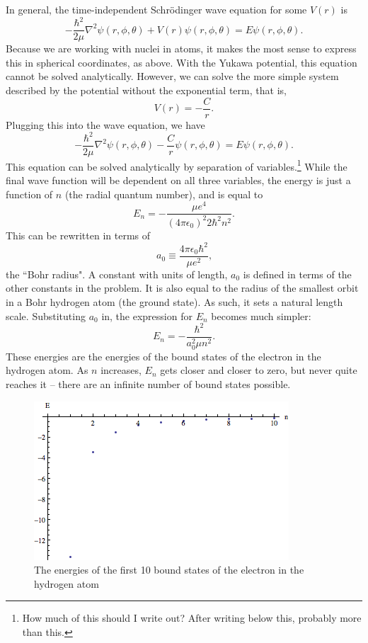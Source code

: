 \documentclass[12pt,twoside]{reedthesis}
\newcommand{\eqn}[1]{\begin{equation}#1\end{equation}}
\begin{document}
In general, the time-independent Schr\"odinger wave equation for some $V(r)$ is
\eqn{
-\frac{\hbar^2}{2\mu}\nabla^2\psi(r,\phi,\theta) + V(r)\psi (r,\phi,\theta) = E \psi(r,\phi,\theta)\mbox{.}
\label{eq:TIDSWE-general}
}
Because we are working with nuclei in atoms, it makes the most sense to express this in spherical coordinates, as above. With the Yukawa potential, this equation cannot be solved analytically. However, we can solve the more simple system described by the potential without the exponential term, that is,
\eqn{
 V(r) = -\frac{C}{r}\mbox{.}
 }
 Plugging this into the wave equation, we have
 \eqn{
 -\frac{\hbar^2}{2\mu}\nabla^2\psi(r,\phi,\theta) -\frac{C}{r}\psi (r,\phi,\theta) = E \psi(r,\phi,\theta)\mbox{.}
 }
This equation can be solved analytically by separation of variables.\footnote{How much of this should I write out? After writing below this, probably more than this.} While the final wave function will be dependent on all three variables, the energy is just a function of $n$ (the radial quantum number), and is equal to
\eqn{
E_n = -\frac{\mu e^4}{(4 \pi \epsilon_0)^2 2 \hbar ^2 n^2}\mbox{.}
\label{eq:hydrogen-E}
}
This can be rewritten in terms of 
\eqn{
a_0 \equiv \frac{4 \pi \epsilon_0 \hbar ^2}{\mu e^2}\mbox{,}
}
the ``Bohr radius". A constant with units of length, $a_0$ is defined in terms of the other constants in the problem. It is also equal to the radius of the smallest orbit in a Bohr hydrogen atom (the ground state). As such, it sets a natural length scale. Substituting $a_0$ in, the expression for $E_n$ becomes much simpler:
\eqn{
E_n = -\frac{\hbar^2}{a_0^2 \mu n^2}\mbox{.}
\label{eq:hydrogen-Ebohr}
}
These energies are the energies of the bound states of the electron in the hydrogen atom. As $n$ increases, $E_n$ gets closer and closer to zero, but never quite reaches it -- there are an infinite number of bound states possible.
\begin{figure}
\includegraphics[scale=0.75]{hydrogenspectrum.png}
\caption{The energies of the first 10 bound states of the electron in the hydrogen atom}
\label{fig:hspec}
\end{figure}
\end{document}
